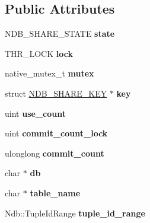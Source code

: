 \subsection*{Public Attributes}
\begin{DoxyCompactItemize}
\item 
\mbox{\label{structNDB__SHARE_a10e40684017e5cdc73f8555f8dcbe277}} 
N\+D\+B\+\_\+\+S\+H\+A\+R\+E\+\_\+\+S\+T\+A\+TE {\bfseries state}
\item 
\mbox{\label{structNDB__SHARE_afcc67db190cf65a909f1d06e91a9f2c7}} 
T\+H\+R\+\_\+\+L\+O\+CK {\bfseries lock}
\item 
\mbox{\label{structNDB__SHARE_ac4515ea44e3ef65caabe1572c2df4063}} 
native\+\_\+mutex\+\_\+t {\bfseries mutex}
\item 
\mbox{\label{structNDB__SHARE_a0af3a5791611033ad700d5d8b74eaaba}} 
struct \mbox{\hyperlink{structNDB__SHARE__KEY}{N\+D\+B\+\_\+\+S\+H\+A\+R\+E\+\_\+\+K\+EY}} $\ast$ {\bfseries key}
\item 
\mbox{\label{structNDB__SHARE_afd4ac03b2d170cca99d695a1ce25661f}} 
uint {\bfseries use\+\_\+count}
\item 
\mbox{\label{structNDB__SHARE_a4cf0b064d619e9ce0907dcf1fdb43b1d}} 
uint {\bfseries commit\+\_\+count\+\_\+lock}
\item 
\mbox{\label{structNDB__SHARE_a93f5c581b14930957deb5286f252e158}} 
ulonglong {\bfseries commit\+\_\+count}
\item 
\mbox{\label{structNDB__SHARE_afbc95a8e20a83a65a00ae35477ef9ab3}} 
char $\ast$ {\bfseries db}
\item 
\mbox{\label{structNDB__SHARE_ab00c2a43859de24915cb3574b8b09b98}} 
char $\ast$ {\bfseries table\+\_\+name}
\item 
\mbox{\label{structNDB__SHARE_aa01ca603d864ef83824d74c348a5df03}} 
Ndb\+::\+Tuple\+Id\+Range {\bfseries tuple\+\_\+id\+\_\+range}
\item 
\mbox{\label{structNDB__SHARE_a95f1488b604f8211fb64d26b77c4ea61}} 

\end{DoxyCompactItemize}
